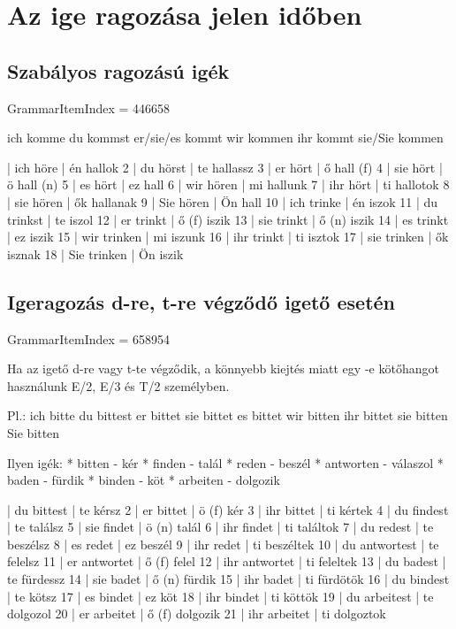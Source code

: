 \documentclass{article}
\newenvironment{desc}{\verbatim}{\endverbatim}
\newenvironment{exmp}{\verbatim}{\endverbatim}
\begin{document}
\section{Az ige ragozása jelen időben}

\subsection{Szabályos ragozású igék}

GrammarItemIndex = 446658

\begin{desc}
ich komme
du kommst
er/sie/es kommt
wir kommen
ihr kommt
sie/Sie kommen
\end{desc}

\begin{exmp}
1 | ich höre | én hallok
2 | du hörst | te hallassz
3 | er hört | ő hall (f)
4 | sie hört | ö hall (n)
5 | es hört | ez hall
6 | wir hören | mi hallunk
7 | ihr hört | ti hallotok
8 | sie hören | ők hallanak
9 | Sie hören | Ön hall
10 | ich trinke | én iszok
11 | du trinkst | te iszol
12 | er trinkt | ő (f) iszik
13 | sie trinkt | ő (n) iszik
14 | es trinkt | ez iszik
15 | wir trinken | mi iszunk
16 | ihr trinkt | ti isztok
17 | sie trinken | ők isznak
18 | Sie trinken | Ön iszik
\end{exmp}

\subsection{Igeragozás d-re, t-re végződő igető esetén}

GrammarItemIndex = 658954

\begin{desc}
Ha az igető d-re vagy t-te végződik, a könnyebb kiejtés miatt egy -e
kötőhangot használunk E/2, E/3 és T/2 személyben.

Pl.:
ich bitte
du bittest
er bittet
sie bittet
es bittet
wir bitten
ihr bittet
sie bitten
Sie bitten

Ilyen igék:
* bitten - kér
* finden - talál
* reden - beszél
* antworten - válaszol
* baden - fürdik
* binden - köt
* arbeiten - dolgozik
\end{desc}

\begin{exmp}
1 | du bittest | te kérsz
2 | er bittet | ö (f) kér
3 | ihr bittet | ti kértek
4 | du findest | te találsz
5 | sie findet | ö (n) talál
6 | ihr findet | ti találtok
7 | du redest | te beszélsz
8 | es redet | ez beszél
9 | ihr redet | ti beszéltek
10 | du antwortest | te felelsz
11 | er antwortet | ő (f) felel
12 | ihr antwortet | ti feleltek
13 | du badest | te fürdessz
14 | sie badet | ő (n) fürdik
15 | ihr badet | ti fürdötök
16 | du bindest | te kötsz
17 | es bindet | ez köt
18 | ihr bindet | ti köttök
19 | du arbeitest | te dolgozol
20 | er arbeitet | ő (f) dolgozik
21 | ihr arbeitet | ti dolgoztok
\end{exmp}
\end{document}
